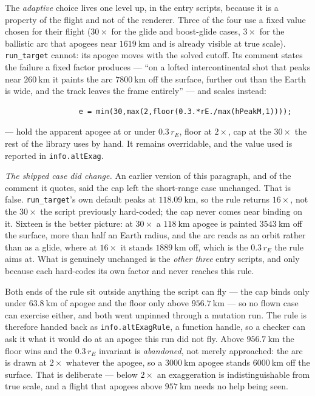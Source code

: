 \documentclass[11pt]{article}
\newcommand{\code}[1]{\texttt{#1}}
\begin{document}
The \emph{adaptive} choice lives one level up, in the entry scripts, because it
is a property of the flight and not of the renderer. Three of the four use a
fixed value chosen for their flight ($30\times$ for the glide and boost-glide
cases, $3\times$ for the ballistic arc that apogees near $1619~\mathrm{km}$ and
is already visible at true scale). \code{run\_target} cannot: its apogee moves
with the solved cutoff. Its comment states the failure a fixed factor produces
--- ``on a lofted intercontinental shot that peaks near $260~\mathrm{km}$ it
paints the arc $7800~\mathrm{km}$ off the surface, further out than the Earth
is wide, and the track leaves the frame entirely'' --- and scales instead:

\begin{lstlisting}
                 e = min(30,max(2,floor(0.3.*rE./max(hPeakM,1))));
\end{lstlisting}

--- hold the apparent apogee at or under $0.3\,r_E$, floor at $2\times$, cap at
the $30\times$ the rest of the library uses by hand. It remains overridable,
and the value used is reported in \code{info.altExag}.

\emph{The shipped case did change.} An earlier version of this paragraph, and
of the comment it quotes, said the cap left the short-range case unchanged.
That is false. \code{run\_target}'s own default peaks at
$118.09~\mathrm{km}$, so the rule returns $16\times$, not the $30\times$ the
script previously hard-coded; the cap never comes near binding on it.
Sixteen is the better picture: at $30\times$ a $118~\mathrm{km}$ apogee is
painted $3543~\mathrm{km}$ off the surface, more than half an Earth radius, and
the arc reads as an orbit rather than as a glide, where at $16\times$ it stands
$1889~\mathrm{km}$ off, which is the $0.3\,r_E$ the rule aims at. What is
genuinely unchanged is the \emph{other three} entry scripts, and only because
each hard-codes its own factor and never reaches this rule.

Both ends of the rule sit outside anything the script can fly --- the cap binds
only under $63.8~\mathrm{km}$ of apogee and the floor only above
$956.7~\mathrm{km}$ --- so no flown case can exercise either, and both went
unpinned through a mutation run. The rule is therefore handed back as
\code{info.altExagRule}, a function handle, so a checker can ask it what it
would do at an apogee this run did not fly. Above $956.7~\mathrm{km}$ the floor
wins and the $0.3\,r_E$ invariant is \emph{abandoned}, not merely approached:
the arc is drawn at $2\times$ whatever the apogee, so a $3000~\mathrm{km}$
apogee stands $6000~\mathrm{km}$ off the surface. That is deliberate --- below
$2\times$ an exaggeration is indistinguishable from true scale, and a flight
that apogees above $957~\mathrm{km}$ needs no help being seen.
\end{document}
